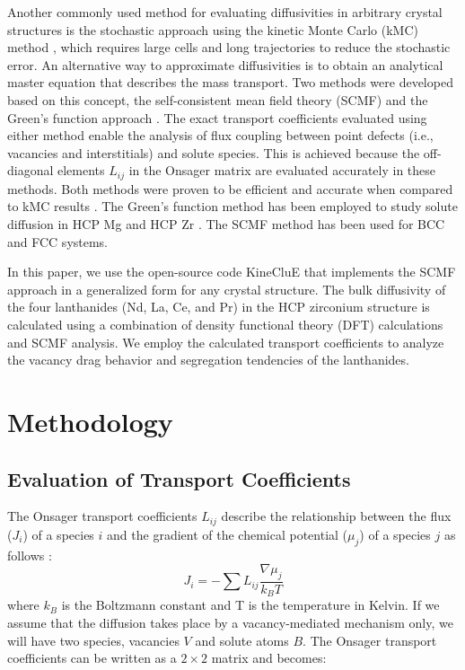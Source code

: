 \documentclass[preprint,12pt]{elsarticle}
\begin{document}
Another commonly used method for evaluating diffusivities in arbitrary crystal structures is the stochastic approach using the kinetic Monte Carlo (kMC) method \cite{murch_simulation_1984, belova_collective_2000}, which requires large cells and long trajectories to reduce the stochastic error. An alternative way to approximate diffusivities is to obtain an analytical master equation that describes the mass transport. Two methods were developed based on this concept, the self-consistent mean field theory (SCMF) \cite{nastar_self-consistent_2000, nastar_mean_2005} and the Green's function approach \cite{trinkle_automatic_2017}. The exact transport coefficients evaluated using either method enable the analysis of flux coupling between point defects (i.e., vacancies and interstitials) and solute species. This is achieved because the off-diagonal elements $L_{ij}$ in the Onsager matrix are evaluated accurately in these methods. Both methods were proven to be efficient and accurate when compared to kMC results \cite{jain_first-principles_2019, messina_solute_2020}.
The Green's function method has been employed to study solute diffusion in HCP Mg \cite{agarwal_exact_2017} and HCP Zr \cite{jain_first-principles_2019}. The SCMF method has been used for BCC \cite{messina_exact_2014, messina_solute_2020} and FCC \cite{garnier_quantitative_2014, toijer_solute-point_2021} systems.

In this paper, we use the open-source code KineCluE \cite{schuler_kineclue_2020} that implements the SCMF approach in a generalized form for any crystal structure. The bulk diffusivity of the four lanthanides (Nd, La, Ce, and Pr) in the HCP zirconium structure is calculated using a combination of density functional theory (DFT) calculations and SCMF analysis. We employ the calculated transport coefficients to analyze the vacancy drag behavior and segregation tendencies of the lanthanides.

\section{Methodology}

\subsection{Evaluation of Transport Coefficients}

The Onsager transport coefficients $L_{ij}$ describe the relationship between the flux ($J_i$) of a species $i$ and the gradient of the chemical potential ($\mu_j$) of a species $j$ as follows \cite{allnatt_atomic_2003} :
\begin{equation}
\label{eq_onsager}
    J_i = -\sum{L_{ij} \frac{\nabla\mu_j}{k_B T}}
\end{equation}
where $k_B$ is the Boltzmann constant and T is the temperature in Kelvin. If we assume that the diffusion takes place by a vacancy-mediated mechanism only, we will have two species, vacancies $V$ and solute atoms $B$. The Onsager transport coefficients can be written as a $2\times2$ matrix and  becomes:
\end{document}
